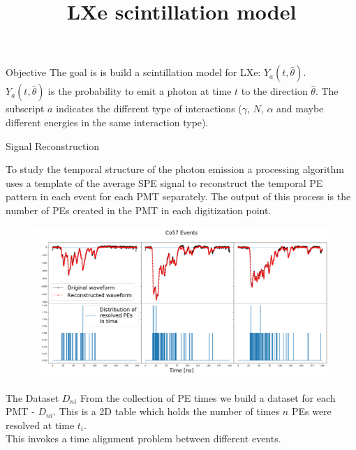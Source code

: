 \documentclass{beamer}
\title{LXe scintillation model}
\begin{document}
{ 
\frame{\titlepage}}

\begin{frame}{Objective}
The goal is is build a scintillation model for LXe: $Y_{a}(t,\hat{\theta})$.\\
$Y_{a}(t,\hat{\theta})$ is the probability to emit a photon at time $t$ to the direction $\hat{\theta}$. The subscript $a$ indicates the different type of interactions ($\gamma$, $N$, $\alpha$ and maybe different energies in the same interaction type).\\
\end{frame}


\begin{frame}{Signal Reconstruction}
	\begin{center}
	\end{center}
To study the temporal structure of the photon emission a processing algorithm uses a template of the average SPE signal to reconstruct the temporal PE pattern in each event for each PMT separately. The output of this process is the number of PEs created in the PMT in each digitization point.

\begin{figure}[h]
\includegraphics[width=1\textwidth]{recons.png}
\end{figure}
\end{frame}

\begin{frame}{The Dataset $D_{ni}$}
From the collection of PE times we build a dataset for each PMT - $D_{ni}$. This is a 2D table which holds the number of times $n$ PEs were resolved at time $t_i$.\\
This invokes a time alignment problem between different events.


\end{frame}
\end{document}
